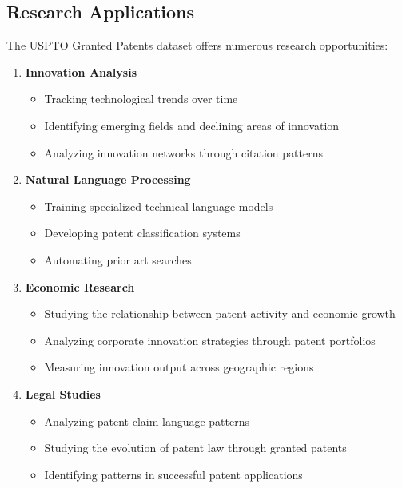 \subsection{Research Applications}

The USPTO Granted Patents dataset offers numerous research opportunities:

\begin{enumerate}
    \item \textbf{Innovation Analysis}
    \begin{itemize}
        \item Tracking technological trends over time
        \item Identifying emerging fields and declining areas of innovation
        \item Analyzing innovation networks through citation patterns
    \end{itemize}
    
    \item \textbf{Natural Language Processing}
    \begin{itemize}
        \item Training specialized technical language models
        \item Developing patent classification systems
        \item Automating prior art searches
    \end{itemize}
    
    \item \textbf{Economic Research}
    \begin{itemize}
        \item Studying the relationship between patent activity and economic growth
        \item Analyzing corporate innovation strategies through patent portfolios
        \item Measuring innovation output across geographic regions
    \end{itemize}
    
    \item \textbf{Legal Studies}
    \begin{itemize}
        \item Analyzing patent claim language patterns
        \item Studying the evolution of patent law through granted patents
        \item Identifying patterns in successful patent applications
    \end{itemize}
\end{enumerate}

